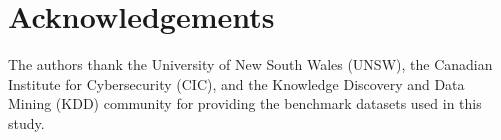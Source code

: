 \documentclass[conference]{IEEEtran}
\begin{document}
\section*{Acknowledgements}
The authors thank the University of New South Wales (UNSW),
the Canadian Institute for Cybersecurity (CIC), and the
Knowledge Discovery and Data Mining (KDD) community for
providing the benchmark datasets used in this study.



\end{document}
